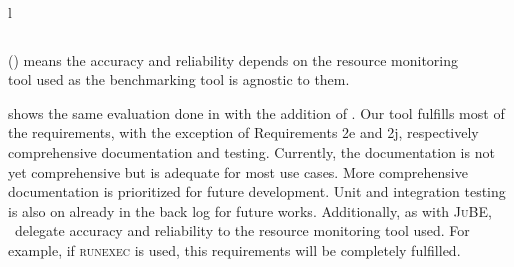 \begin{table}
\begin{threeparttable}
\begin{adjustbox}{max width=\textwidth}
\begin{tabular}{l}
\begin{tabular}{l | cccccc | ccccc}
						\pmb{\checkmark} & \pmb{\checkmark} & \pmb{\checkmark} & \pmb{\checkmark} & \pmb{\checkmark} \\
                    \bottomrule
                \end{tabular}
            \end{tabular}
        \end{adjustbox}
        \begin{tablenotes}
            \note (\textasteriskcentered) means the accuracy and reliability depends on the resource monitoring\\ tool used as the benchmarking tool is agnostic to them.
        \end{tablenotes}
    \end{threeparttable}
\end{table}

 shows the same evaluation done in  with the addition of \OurBenchmarkingTool.
Our tool fulfills most of the requirements, with the exception of Requirements 2e and 2j, respectively comprehensive documentation and testing.
Currently, the documentation is not yet comprehensive but is adequate for most use cases.
More comprehensive documentation is prioritized for future development.
Unit and integration testing is also on already in the back log for future works.
Additionally, as with \textsc{JuBE}, \first~delegate accuracy and reliability to the resource monitoring tool used.
For example, if \textsc{runexec} is used, this requirements will be completely fulfilled.
